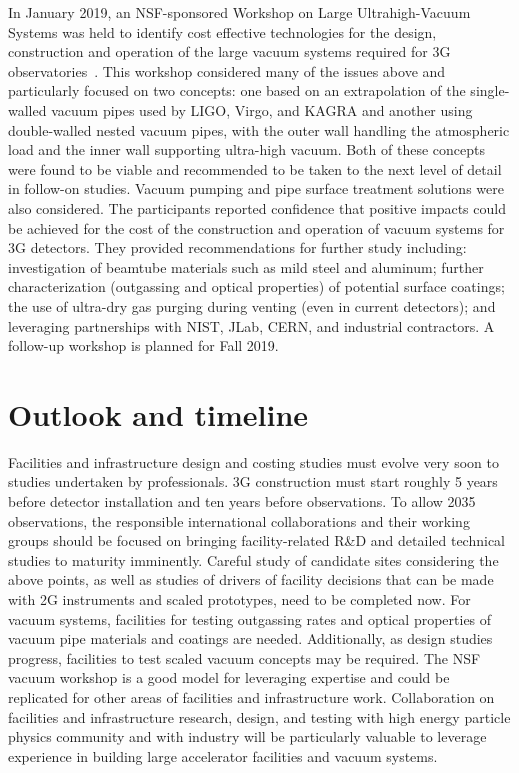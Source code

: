 In January 2019, an NSF-sponsored Workshop on Large Ultrahigh-Vacuum Systems was held to identify cost effective technologies for the design, construction and operation of the large vacuum systems required for 3G observatories~\cite{LLOVacWorkshop2019}. This workshop considered many of the issues above and particularly focused on two concepts: one based on an extrapolation of the single-walled vacuum pipes used by LIGO, Virgo, and KAGRA and another using double-walled nested vacuum pipes, with the outer wall handling the atmospheric load and the inner wall supporting ultra-high vacuum. Both of these concepts were found to be viable and recommended to be taken to the next level of detail in follow-on studies. Vacuum pumping and pipe surface treatment solutions were also considered. The participants reported confidence that positive impacts could be achieved for the cost of the construction and operation of vacuum systems for 3G detectors. They provided recommendations for further study including: investigation of beamtube materials such as mild steel and aluminum; further characterization (outgassing and optical properties) of potential surface coatings; the use of ultra-dry gas purging during venting (even in current detectors); and leveraging partnerships with NIST, JLab, CERN, and industrial contractors. A follow-up workshop is planned for Fall 2019.

\section{Outlook and timeline}
Facilities and infrastructure design and costing studies must evolve very soon to studies undertaken by professionals. 3G construction must start roughly 5 years before detector installation and ten years before observations. To allow 2035 observations, the responsible international collaborations and their working groups should be focused on bringing facility-related R\&D and detailed technical studies to maturity imminently.
Careful study of candidate sites considering the above points, as well as studies of drivers of facility decisions that can be made with 2G instruments and scaled prototypes, need to be completed now. For vacuum systems, facilities for testing outgassing rates and optical properties of vacuum pipe materials and coatings are needed. Additionally, as design studies progress, facilities to test scaled vacuum concepts may be required.
The NSF vacuum workshop is a good model for leveraging expertise and could be replicated for other areas of facilities and infrastructure work.
Collaboration on facilities and infrastructure research, design, and testing with high energy particle physics community and with industry will be particularly valuable to leverage experience in building large accelerator facilities and vacuum systems.

